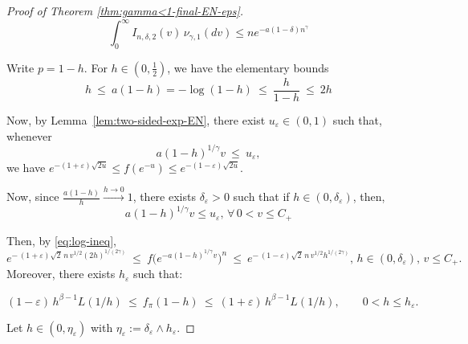 \documentclass[preprint]{imsart}
\newcommand{\1}{\mathbf{1}}
\theoremstyle{plain}
\theoremstyle{definition}
\begin{document}
\begin{proof}[Proof of Theorem \ref{thm:gamma<1-final-EN-eps}]
\begin{equation}\label{cotaIn,delta,2}
    \int_0^\infty I_{n,\delta,2}(v)\,\nu_{\gamma,1}(dv)\le n e^{-a(1-\delta) n^\gamma}
\end{equation}

Write \(p=1-h\). For \(h\in(0,\tfrac12)\), we have the elementary bounds
\begin{equation}\label{eq:log-ineq}
h\ \le\ a(1-h)=-\log(1-h)\ \le\ \frac{h}{1-h}\ \le\ 2h
\end{equation}

Now, by Lemma~\ref{lem:two-sided-exp-EN}, there exist \(u_\varepsilon\in(0,1)\) such that, whenever
\[
a(1-h)^{1/\gamma}v\ \le\ u_\varepsilon,
\]
we have \(e^{-(1+\varepsilon)\sqrt{2u}}\le f(e^{-u})\le e^{-(1-\varepsilon)\sqrt{2u}}\). 

Now, since \(\frac{a(1-h)}{h}\overset{h\to 0}{\to}1\), there exists \(\delta_\varepsilon>0\) such that if \(h\in (0,\delta_\varepsilon)\), then, 
\[
a(1-h)^{1/\gamma}v\leq u_{\varepsilon},\,\forall\, 0<v\le C_{+}
\]

Then, by \eqref{eq:log-ineq},
\[
e^{-\,(1+\varepsilon)\sqrt{2}\,n\,v^{1/2} (2h)^{1/(2\gamma)}}\ \le\ f\!\big(e^{-a(1-h)^{1/\gamma}v}\big)^{n}
\ \le\ e^{-\,(1-\varepsilon)\sqrt{2}\,n\,v^{1/2} h^{1/(2\gamma)}},\, h\in(0,\delta_\varepsilon),\,v\le C_{+}.
\]
Moreover, there exists \(h_{\varepsilon}\) such that:


\[
(1-\varepsilon)\,h^{\beta-1}L(1/h)
\ \le\ f_\pi(1-h)\ \le\
(1+\varepsilon)\,h^{\beta-1}L(1/h),\qquad 0<h\le h_\varepsilon.
\]

Let \(h\in (0,\eta_{\varepsilon})\) with \(\eta_{\varepsilon}:=\delta_{\varepsilon}\wedge h_{\varepsilon}\). 


\end{proof}
\end{document}
